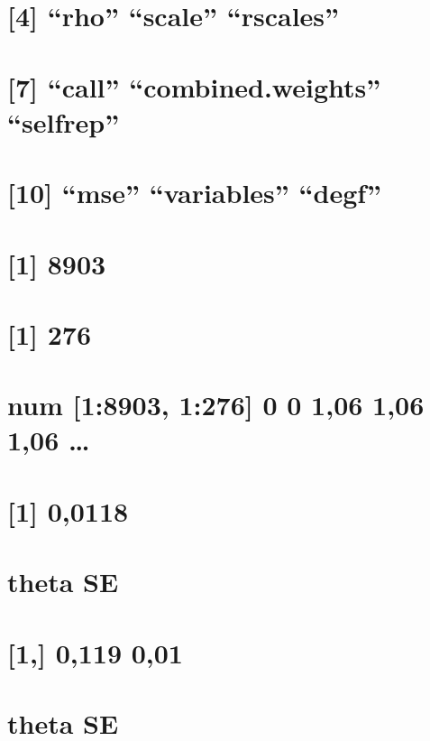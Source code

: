 \documentclass[]{book}
\theoremstyle{definition}
\theoremstyle{definition}
\theoremstyle{definition}
\theoremstyle{remark}
\begin{document}
\section{\texorpdfstring{{[}4{]} ``rho'' ``scale''
``rscales''}{{[}4{]} rho scale rscales}}\label{rho-scale-rscales}

\section{\texorpdfstring{{[}7{]} ``call'' ``combined.weights''
``selfrep''}{{[}7{]} call combined.weights selfrep}}\label{call-combined.weights-selfrep}

\section{\texorpdfstring{{[}10{]} ``mse'' ``variables''
``degf''}{{[}10{]} mse variables degf}}\label{mse-variables-degf}

\section{{[}1{]} 8903}\label{section-5}

\section{{[}1{]} 276}\label{section-6}

\section{num {[}1:8903, 1:276{]} 0 0 1,06 1,06 1,06
\ldots{}}\label{num-18903-1276-0-0-106-106-106}

\section{{[}1{]} 0,0118}\label{section-7}

\section{theta SE}\label{theta-se}

\section{{[}1,{]} 0,119 0,01}\label{section-8}

\section{theta SE}\label{theta-se-1}
\end{document}

